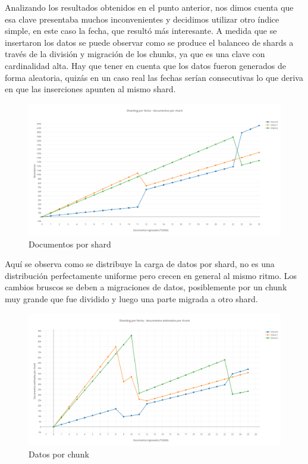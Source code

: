 Analizando los resultados obtenidos en el punto anterior, nos dimos cuenta que esa clave presentaba muchos inconvenientes y
decidimos utilizar otro índice simple, en este caso la fecha, que resultó más interesante. A medida que se insertaron los 
datos se puede observar como se produce el balanceo de shards a través de la división y migración de los chunks, ya que es una clave con 
cardinalidad alta. Hay que tener en cuenta que los datos fueron generados de forma aleatoria, quizás en un caso real las fechas serían 
consecutivas lo que deriva en que las inserciones apunten al mismo shard.

\begin{figure}[h!]
 \centering
 \includegraphics[scale=0.3,keepaspectratio=true]{./fecha-documentos-por-shard.png}
 \caption{Documentos por shard}
\end{figure}

Aquí se observa como se distribuye la carga de datos por shard, no es una distribución perfectamente uniforme pero crecen en general al mismo ritmo. Los cambios bruscos
se deben a migraciones de datos, posiblemente por un chunk muy grande que fue dividido y luego una parte migrada a otro shard.

\begin{figure}[h!]
 \centering
 \includegraphics[scale=0.3,keepaspectratio=true]{./fecha-documentos-estimados-por-chunk.png}
 \caption{Datos por chunk}
\end{figure}

